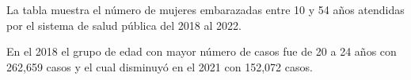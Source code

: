 La tabla muestra el número de mujeres embarazadas entre 10 y 54 años atendidas por el sistema de salud pública del 2018 al 2022. 

En el 2018 el grupo de edad con mayor número de casos fue de 20 a 24 años con 262,659 casos y el cual disminuyó en el 2021 con 152,072 casos. 


